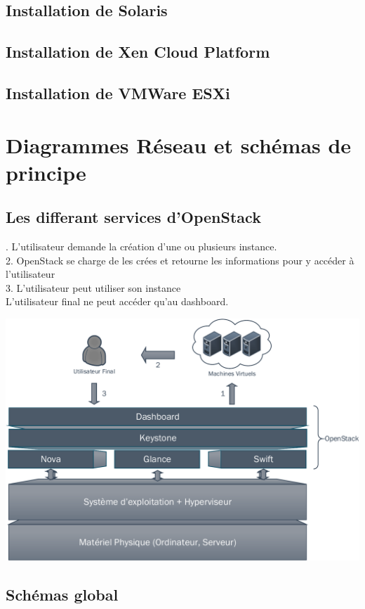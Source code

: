 \documentclass[a4paper,oneside]{report}
\begin{document}
\section{Installation de Solaris}

\section{Installation de Xen Cloud Platform}

\section{Installation de VMWare ESXi}

\chapter{Diagrammes Réseau et schémas de principe}
\section{Les differant services d'OpenStack}
. L'utilisateur demande la création d'une ou plusieurs instance.\\
2. OpenStack se charge de les crées et retourne les informations pour y accéder à l'utilisateur\\
3. L'utilisateur peut utiliser son instance\\
L'utilisateur final ne peut accéder qu'au dashboard.
\begin{center}
\includegraphics[scale=0.8,angle=90]{images/principeOpenStack-crop.pdf}
\end{center}
\section{Schémas global} \label{sch:glob}
\end{document}
